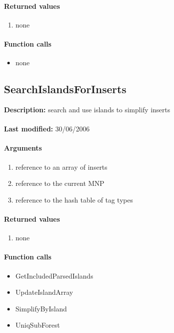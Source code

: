 \paragraph{Returned values}
\begin{enumerate}
\item none
\end{enumerate}

\paragraph{Function calls}
\begin{itemize}
\item none
\end{itemize}

\subsection{SearchIslandsForInserts}
\textbf{Description:} search and use islands to simplify inserts\\
\\\textbf{Last modified:} 30/06/2006

\paragraph{Arguments}
\begin{enumerate}
\item reference to an array of inserts
\item reference to the current MNP
\item reference to the hash table of tag types
\end{enumerate}

\paragraph{Returned values}
\begin{enumerate}
\item none
\end{enumerate}

\paragraph{Function calls}
\begin{itemize}
\item GetIncludedParsedIslands
\item UpdateIslandArray
\item SimplifyByIsland
\item UniqSubForest
\end{itemize}


